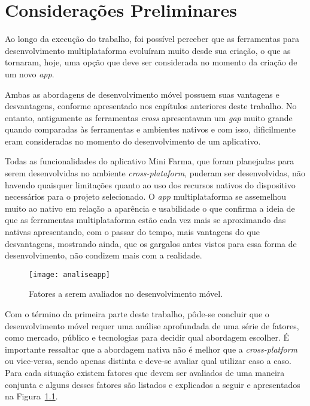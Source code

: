 \chapter{Considerações Preliminares} \label{cap:consideracoespreliminares}

Ao longo da execução do trabalho, foi possível perceber que as ferramentas para desenvolvimento multiplataforma 
evoluíram muito desde sua criação, o que as tornaram, hoje, uma opção que deve ser considerada no momento da criação de um novo \textit{app}.

Ambas as abordagens de desenvolvimento móvel possuem suas vantagens e desvantagens, conforme apresentado nos capítulos anteriores deste trabalho. 
No entanto, antigamente as ferramentas \textit{cross} apresentavam um \textit{gap} muito grande quando comparadas às ferramentas e ambientes nativos e com isso, 
dificilmente eram consideradas no momento do desenvolvimento de um aplicativo.

Todas as funcionalidades do aplicativo Mini Farma, que foram planejadas para serem desenvolvidas no ambiente \textit{cross-plataform}, puderam ser desenvolvidas, não havendo quaisquer limitações 
quanto ao uso dos recursos nativos do dispositivo necessários para o projeto selecionado. O \textit{app} multiplataforma se assemelhou muito 
ao nativo em relação a aparência e usabilidade o que confirma a ideia de que as ferramentas multiplataforma estão cada vez mais se aproximando
das nativas apresentando, com o passar do tempo, mais vantagens do que desvantagens, mostrando ainda, que os gargalos antes vistos para essa forma de desenvolvimento, não condizem
mais com a realidade.

\begin{figure}[H]
	\centering
	\texttt{[image: analiseapp]}
	\caption[Fatores a serem avaliados no desenvolvimento móvel]{ Fatores a serem avaliados no desenvolvimento móvel.}
	\label{fig:analiseapp}
\end{figure}

Com o término da primeira parte deste trabalho, pôde-se concluir que o desenvolvimento móvel requer uma análise aprofundada de uma série de fatores, 
como mercado, público e tecnologias para decidir qual abordagem escolher.
É importante ressaltar que a abordagem nativa não é melhor que a \textit{cross-platform} ou vice-versa, sendo apenas distinta e deve-se avaliar qual utilizar caso a 
caso. Para cada situação existem fatores que devem ser avaliados de uma maneira conjunta e alguns desses fatores são listados e explicados a seguir e apresentados na Figura~\ref{fig:analiseapp}.


